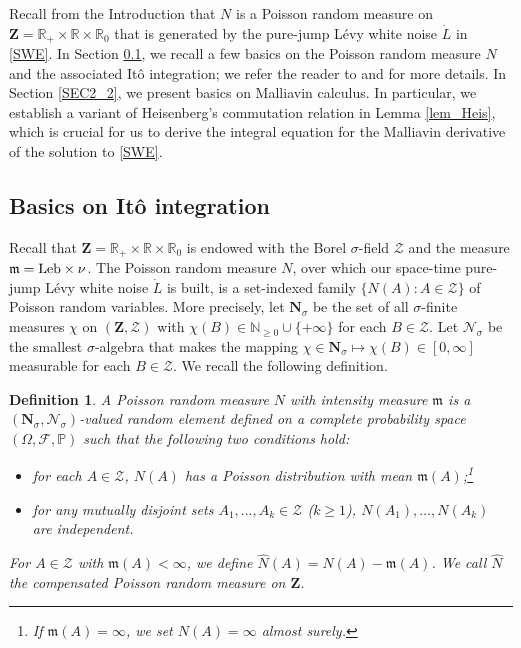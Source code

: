 \documentclass[letterpaper, 11pt,  reqno]{amsart}
\newcommand{\wh}{\widehat}
\newtheorem{definition}[theorem]{Definition}
\newcommand{\noi}{\noindent}
\newcommand{\R}{\mathbb{R}}
\newcommand{\bR}{\mathbb{R}}
\newcommand{\F}{\mathcal{F}}
\newcommand{\s}{\sigma}
\renewcommand{\O}{\Omega}
\newcommand{\N}{\mathbb{N}}
\newcommand{\fm}{\mathfrak{m}}
\numberwithin{equation}{section}
\numberwithin{theorem}{section}
\begin{document}
Recall from the Introduction that 
  $N$ is a Poisson random measure on $\mathbf{Z}=\R_+\times\R\times\R_0$
  that is generated by the pure-jump L\'evy white noise $\dot{L}$ in \eqref{SWE}.
In  Section \ref{SEC2_1}, we recall a few basics on 
the Poisson random measure $N$ and the associated 
It\^o integration;  we refer the reader to \cite[Section 4.2.1]{applebaum09}
 and \cite[Section 8.7]{PZ07} for more details.
 In Section \ref{SEC2_2}, we present basics on Malliavin calculus.
 In particular, we establish a variant of Heisenberg's commutation relation
 in Lemma \ref{lem_Heis}, which is crucial for us to derive
 the integral equation for the Malliavin derivative of the solution to \eqref{SWE}.
 
 
 
 \subsection{Basics on It\^o integration} 
 \label{SEC2_1}
 






Recall that $\mathbf{Z}=\bR_{+} \times \bR \times \bR_0$ is endowed with the Borel 
$\s$-field $\mathcal{Z}$ and the measure $\fm={\rm Leb} \times \nu$. 
The Poisson random measure $N$, over which 
our space-time pure-jump L\'evy white noise $\dot{L}$  is built,
is a set-indexed family $\{ N(A): A\in \mathcal{Z}\}$ of Poisson random variables. 
More precisely, let  $\mathbf{N}_\s$ be the set of all  $\s$-finite  measures $\chi$
on $(\mathbf{Z}, \mathcal{Z})$ with $\chi(B)\in \N_{\geq 0} \cup \{+\infty\}$
for each $B\in\mathcal{Z}$. Let $\mathscr{N}_\s$ be the smallest $\s$-algebra
that makes the mapping
$\chi\in \mathbf{N}_\s \mapsto \chi(B)\in[0,\infty]$
measurable for each $B\in\mathcal{Z}$. We recall the following definition.


\begin{definition}
\label{def:PRM}
A   Poisson random measure $N$ with intensity measure $\fm$ is a 
$(\mathbf{N}_\s,\mathscr{N}_\s)$-valued random element   
defined on a complete probability space 
$(\O, \F, \mathbb{P})$ such that the following two conditions hold:

\noi
\begin{itemize}
\item for each $A\in\mathcal{Z}$, $N(A)$ has a Poisson distribution  
with mean $\fm(A)$;\footnote{If $\fm(A)=\infty$,
we set $N(A)=\infty$ almost surely.}

\item  for any mutually disjoint sets $A_1, ... , A_k\in\mathcal{Z}$  {\rm(}$k\geq 1${\rm)}, 
$N(A_1), ... , N(A_k)$ are independent.

\end{itemize}
For $A\in\mathcal{Z}$ with $\fm(A)<\infty$, we define $\wh{N}(A) = N(A) - \fm(A)$. We
call $\wh{N}$  the  compensated Poisson random measure on $\mathbf{Z}$.


\end{definition}
\end{document}
